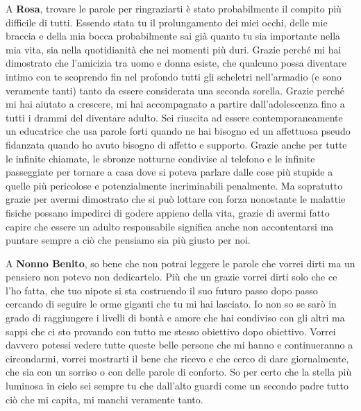 \documentclass[cucitura%
,12pt%
]{toptesi}
\begin{document}
A \textbf{Rosa}, trovare le parole per ringraziarti è stato probabilmente il compito più difficile di tutti. Essendo stata tu il prolungamento dei miei occhi, delle mie braccia e della mia bocca probabilmente sai già quanto tu sia importante nella mia vita, sia nella quotidianità che nei momenti più duri. 
Grazie perché mi hai dimostrato che l’amicizia tra uomo e donna esiste, che qualcuno possa diventare intimo con te  scoprendo fin nel profondo tutti gli scheletri nell’armadio (e sono veramente tanti) tanto da essere considerata una seconda sorella. 
Grazie perché mi hai aiutato a crescere, mi hai accompagnato a partire dall’adolescenza fino a tutti i drammi del diventare adulto. Sei riuscita ad essere contemporaneamente un educatrice che usa parole forti quando ne hai bisogno ed un affettuosa pseudo fidanzata quando ho avuto bisogno di affetto e supporto.
Grazie anche per tutte le infinite chiamate, le sbronze notturne condivise al telefono e le infinite passeggiate per tornare a casa dove si poteva parlare dalle cose più stupide a quelle più pericolose e potenzialmente incriminabili penalmente. Ma sopratutto grazie per avermi dimostrato che si può lottare con 
forza nonostante le malattie fisiche possano impedirci di godere appieno della vita, grazie di avermi fatto capire che essere un adulto responsabile significa anche non accontentarsi ma puntare sempre a ciò che pensiamo sia più giusto per noi. 


A \textbf{Nonno Benito}, so bene che non potrai leggere le parole che vorrei dirti ma un pensiero non potevo non dedicartelo. Più che un grazie vorrei dirti solo che ce l’ho fatta, che tuo nipote si sta costruendo il suo futuro passo dopo passo cercando di seguire le orme giganti che tu mi hai lasciato. 
Io non so se sarò in grado di raggiungere i livelli di bontà e amore che hai condiviso con gli altri ma sappi che ci sto provando con tutto me stesso obiettivo dopo obiettivo. Vorrei davvero potessi vedere tutte queste belle persone che mi hanno e continueranno a circondarmi, vorrei mostrarti il bene
che ricevo e che cerco di dare giornalmente, che sia con un sorriso o con delle parole di conforto. So per certo che la stella più luminosa in cielo sei sempre tu che dall’alto guardi come un secondo padre tutto ciò che mi capita, mi manchi veramente tanto.


\end{document}
